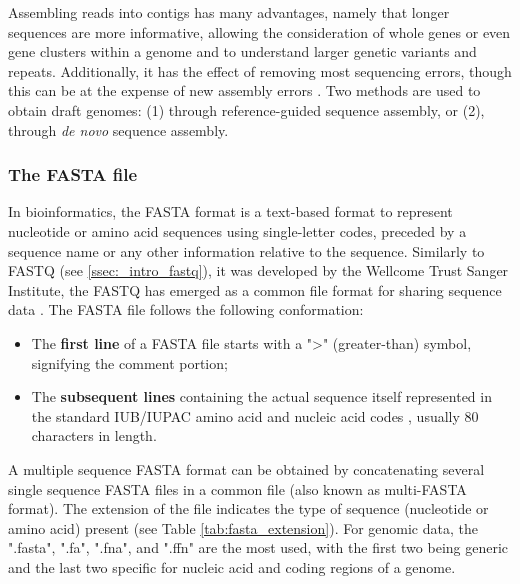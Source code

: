 Assembling reads into contigs has many advantages, namely that longer sequences are more informative, allowing the consideration of whole genes or even gene clusters within a genome and to understand larger genetic variants and repeats. Additionally, it has the effect of removing most sequencing errors, though this can be at the expense of new assembly errors \citep{ayling_new_2020}. Two methods are used to obtain draft genomes: (1) through reference-guided sequence assembly, or (2), through \textit{de novo} sequence assembly.

\subsubsection{The FASTA file} \label{sssec:_intro_fastq}

In bioinformatics, the FASTA format is a text-based format to represent nucleotide or amino acid sequences using single-letter codes, preceded by a sequence name or any other information relative to the sequence. Similarly to FASTQ (see \ref{ssec:_intro_fastq}), it was developed by the Wellcome Trust Sanger Institute, the FASTQ has emerged as a common file format for sharing sequence data \citep{pearson_improved_1988}. The FASTA file follows the following conformation:

\begin{itemize}
    \item The \textbf{first line} of a FASTA file starts with a ">" (greater-than) symbol, signifying the comment portion;
    \item The \textbf{subsequent lines} containing the actual sequence itself represented in the standard IUB/IUPAC amino acid and nucleic acid codes \citep{e_iupac-iub_1970}, usually 80 characters in length.
\end{itemize}

A multiple sequence FASTA format can be obtained by concatenating several single sequence FASTA files in a common file (also known as multi-FASTA format). The extension of the file indicates the type of sequence (nucleotide or amino acid) present (see Table \ref{tab:fasta_extension}). For genomic data, the ".fasta", ".fa", ".fna", and ".ffn" are the most used, with the first two being generic and the last two specific for nucleic acid and coding regions of a genome. 

